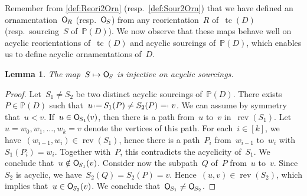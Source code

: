 \documentclass{amsart}
\newtheorem{lemma}[theorem]{Lemma}
\theoremstyle{definition}
\newcommand{\eqdef}{\mbox{\,\raisebox{0.2ex}{\scriptsize\ensuremath{\mathrm:}}\ensuremath{=}\,}} %
\newcommand{\defeq}{\mbox{~\ensuremath{=}\raisebox{0.2ex}{\scriptsize\ensuremath{\mathrm:}} }} %
\DeclareMathOperator{\tc}{tc} %
\newcommand{\Vincent}[1]{\todo[size=\tiny,color=blue!30]{ #1 \\ \hfill --- V.}\,}
\newcommand{\felix}[1]{{\color{orange}#1}}
\newcommand{\mymap}[2]{\mathsf{#1}_{\hspace{-.7pt}#2}}
\newcommand{\orn}[1]{\mymap{O}{#1}}  %
\DeclareMathOperator{\rev}{rev} %
\newcommand{\PP}{\mathbb P} %
\begin{document}
Remember from \cref{def:Reori2Orn} (resp.~\cref{def:Sour2Orn}) that we have defined an ornamentation~$\orn{R}$ (resp.~$\orn{S}$) from any reorientation~$R$ of~$\tc(D)$ (resp.~sourcing~$S$ of~$\PP(D)$).
We now observe that these maps behave well on acyclic reorientations of~$\tc(D)$ and acyclic sourcings of~$\PP(D)$, which enables us to define acyclic ornamentations of~$D$.

\begin{lemma}
\label{lem:ASour2AOrn1}
The map~$S \mapsto \orn{S}$ is injective on acyclic sourcings.
\end{lemma}

\begin{proof}
Let~$S_1 \ne S_2$ be two distinct acyclic sourcings of~$\PP(D)$.
There exists~$P \in \PP(D)$ such that~$u \eqdef S_1(P) \ne S_2(P) \defeq v$.
We can assume by symmetry that~$u < v$.
If~$u \in \orn{S_1}(v)$, then there is a path from~$u$ to~$v$ in~$\rev(S_1)$.
Let~$u = w_0, w_1, \dots, w_k = v$ denote the vertices of this path.
For each~$i \in [k]$, we have~$(w_{i-1},w_i) \in \rev(S_1)$, hence there is a path~$P_i$ from~$w_{i-1}$ to~$w_i$ with~$S_1(P_i) = w_i$.
Together with~$P$, this contradicts the acyclicity of~$S_1$.
We conclude that~${u \notin \orn{S_1}(v)}$.
Consider now the subpath~$Q$ of~$P$ from~$u$ to~$v$.
Since~$S_2$ is acyclic, we have~$S_2(Q) = S_2(P) = v$.
Hence~$(u,v) \in \rev(S_2)$, which implies that~$u \in \orn{S_2}(v)$.
We conclude that~$\orn{S_1} \ne \orn{S_2}$.
\end{proof}

%
\end{document}
